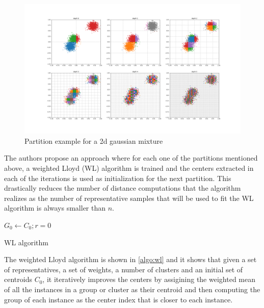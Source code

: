 \begin{figure}[!ht]
    \includegraphics[width=\linewidth]{images/alldepths.png}
    \caption{Partition example for a 2d gaussian mixture}
    \label{fig:partitions}
\end{figure}

The authors propose an approach where for each one of the partitions mentioned above, a weighted Lloyd (WL) algorithm is trained and the centers extracted in each of the iterations is used as initialization for the next partition. This drastically reduces the number of distance computations that the algorithm realizes as the number of representative samples that will be used to fit the WL algorithm is always smaller than $n$. 

\begin{algorithm}[H]
    \SetAlgoLined
    $G_0 \leftarrow C_0; r=0$\;
    \label{algo:wl}
    \caption{WL algorithm}
\end{algorithm}

The weighted Lloyd algorithm is shown in \ref{algo:wl} and it shows that given a set of representatives, a set of weights, a number of clusters and an initial set of centroids $C_0$, it iteratively improves the centers by assigining the weighted mean of all the instances in a group or cluster as their centroid and then computing the group of each instance as the center index that is closer to each instance.

